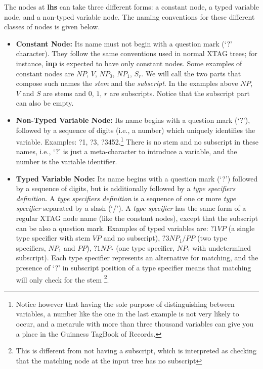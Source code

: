 The nodes at {\bf lhs} can take three 
different forms: a constant node, a typed variable node, and a non-typed 
variable node. The naming conventions for these different classes of nodes is 
given below. 
 
\begin{itemize} 
 
\item {\bf Constant Node:} Its name must not begin with a question mark 
        (`?' character). They follow the same conventions used in normal 
        XTAG trees; for instance, {\bf inp} is expected to have only constant 
        nodes. Some examples of constant nodes are $NP$, $V$, $NP_0$, $NP_1$, 
        $S_r$. We will call the two parts that compose such names 
        the {\it stem} and the {\it subscript}. 
        In the examples above  $NP$, $V$ and $S$ are stems and 
        $0$, $1$, $r$ are subscripts. Notice that the 
        subscript part can also be empty. 
 
\item {\bf Non-Typed Variable Node:} Its name begins with a question 
        mark (`?'), followed by a sequence of digits (i.e., a number) which 
        uniquely identifies the variable. Examples: ?1, ?3, 
        ?3452.\footnote{Notice however that having the sole purpose of         distinguishing between variables, a number like the one in the last         example is not very likely to occur, and a metarule with more than         three thousand variables can give you a place in the Guinness TagBook         of Records.} There is no stem and no subscript in these 
        names, i.e., `?' is just a meta-character to introduce a variable, and 
        the number is the variable identifier. 
 
\item {\bf Typed Variable Node:} Its name begins with a question mark (`?') 
        followed by a sequence of digits, but is additionally followed by a 
        {\it type specifiers definition}. A {\it type specifiers definition} is 
        a sequence of one or more {\it type specifier} separated by a slash 
        (`/'). A {\it type specifier} has the same form of a regular XTAG node 
        name (like the constant nodes), except that the subscript can be also a 
        question mark. Examples of typed variables are: $?1VP$ (a single type 
        specifier with stem $VP$ and no subscript), $?3NP_1/PP$ (two type 
        specifiers, $NP_1$ and $PP$), $?1NP_?$ (one type specifier, $NP_?$ with 
        undetermined subscript).  Each type specifier represents an alternative 
        for matching, and the presence of `?' in subscript position of a type 
        specifier means that matching will only check for the stem 
        \footnote{This is different from not having a subscript, which is        	interpreted as checking that the matching node at the input tree         has no subscript}. 
\end{itemize} 
 
